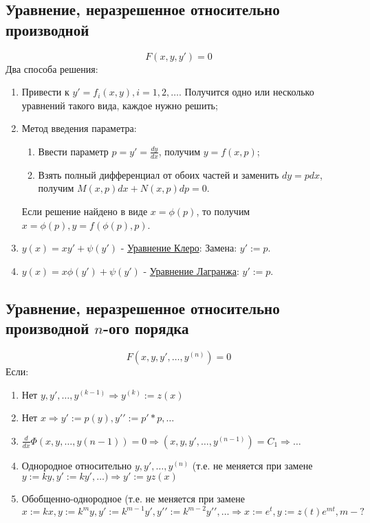 \documentclass[a5paper,10pt]{article}
\begin{document}
		\subsection{Уравнение, неразрешенное относительно производной}
			$$ F(x,y,y\prime) = 0 $$
			Два способа решения:
			\begin{enumerate}
				\item Привести к $ y\prime = f_i(x,y), i=1,2,\ldots $. Получится одно или несколько уравнений такого вида, каждое нужно решить;
				
				\item Метод введения параметра:
					\begin{enumerate}
						\item Ввести параметр $ p = y\prime = \frac{dy}{dx} $, получим $ y = f(x,p) $;
						\item Взять полный дифференциал от обоих частей и заменить $ dy = pdx $, получим $ M(x,p)dx+N(x,p)dp=0 $.
					\end{enumerate}
				Если решение найдено в виде $ x=\phi(p) $, то получим $ x=\phi(p), y=f(\phi(p),p) $.
				\item $ y(x) = xy\prime+\psi(y\prime) $ - \underline{Уравнение Клеро}: Замена: $ y\prime:=p $.
				\item $ y(x) = x\phi(y\prime)+\psi(y\prime) $ - \underline{Уравнение Лагранжа}: $ y\prime:=p $.
			\end{enumerate}

		\subsection{Уравнение, неразрешенное относительно производной $n$-ого порядка}
			$$ F(x,y,y\prime,\ldots,y^{(n)}) = 0 $$
			Если:
			\begin{enumerate}
				\item Нет $ y,y\prime,\ldots,y^{(k-1)} \Rightarrow y^{(k)} := z(x) $
				
				\item Нет $ x \Rightarrow y\prime:=p(y), y\prime\prime:=p\prime*p, \ldots $
				
				\item $ \frac{d}{dx}\Phi(x, y, \ldots, y(n-1))=0 \Rightarrow (x, y, y\prime, \ldots, y^{(n-1)}) = C_1 \Rightarrow \ldots $
				
				\item Однородное относительно $ y,y\prime,\ldots,y^{(n)} $ (т.е. не меняется при замене $ y := ky, y\prime:=ky\prime, \ldots) \Rightarrow y\prime:=yz(x) $
				
				\item Обобщенно-однородное (т.е. не меняется при замене $ x:=kx, y:=k^m y, y\prime:=k^{m-1}y\prime, y\prime\prime:=k^{m-2}y\prime\prime, \ldots\Rightarrow x:=e^t, y:=z(t)e^{mt}, m - ? $
			\end{enumerate}
\end{document}

